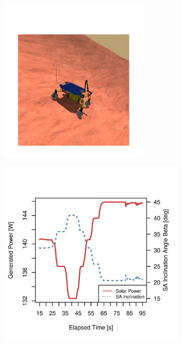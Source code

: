 \begin{figure}[h]
\captionsetup[subfigure]{justification=centering}
\vspace{-4ex}
	\centering
    \setlength{\subfigureWidth}{0.50\textwidth}
    \setlength{\graphicsHeight}{77mm}
    \hypersetup{hidelinks=true}%
    \begin{subfigure}[t]{\subfigureWidth}
        \centering
        \includegraphics[height=80mm]{sections/power-system-design/simulation/images/counter-slope.png}
		\label{fig:sub:rover-slope-compensation-simulation}
    \end{subfigure}\hfill
    \begin{subfigure}[t]{\subfigureWidth}
        \centering
        \includegraphics[height=\graphicsHeight]{sections/power-system-design/simulation/plots/slope-compensation.png}

\end{subfigure}
\end{figure}
